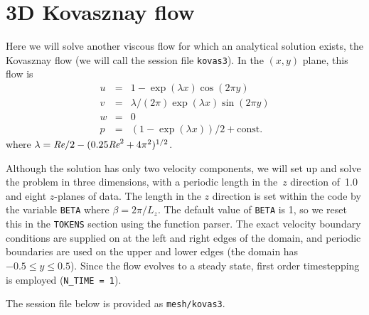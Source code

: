 \documentclass[11pt]{report}
\def\Rey{\mbox{\it Re}}                             %
\begin{document}
\section{3D Kovasznay flow}
\label{sec.kovas}

Here we will solve another viscous flow for which an analytical
solution exists, the Kovasznay flow (we will call the session file
\verb+kovas3+).  In the $(x,y)$ plane, this flow is
\begin{eqnarray}
        u &=& 1 - \exp(\lambda x)\cos(2\pi y)           \\
        v &=& \lambda/(2\pi)\exp(\lambda x)\sin(2\pi y) \\
        w &=& 0                                         \\
        p &=& (1 - \exp(\lambda x))/2  + \textrm{const}. 
\end{eqnarray}
where $\lambda = \Rey/2 - (0.25\Rey^2 + 4\pi^2)^{1/2}$.

Although the solution has only two velocity components, we will set up
and solve the problem in three dimensions, with a periodic length in
the~$z$ direction of~1.0 and eight $z$-planes of data.  The length in
the $z$ direction is set within the code by the variable \verb+BETA+
where $\beta=2\pi/L_z$.  The default value of \verb+BETA+ is 1, so we
reset this in the \texttt{TOKENS} section using the function parser.
The exact velocity boundary conditions are supplied on at the left and
right edges of the domain, and periodic boundaries are used on the
upper and lower edges (the domain has $-0.5\le y\le0.5$).  Since the
flow evolves to a steady state, first order timestepping is employed
(\verb+N_TIME = 1+).

The session file below is provided
as \verb|mesh/kovas3|.
\end{document}
